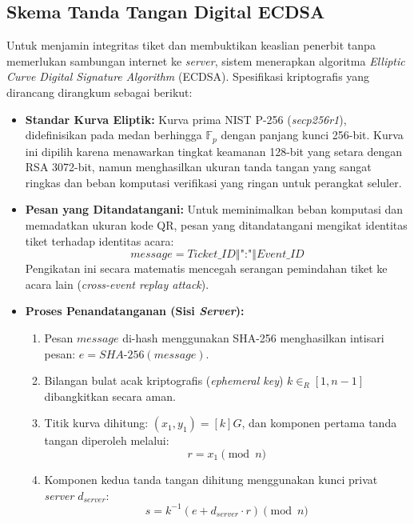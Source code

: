 \subsection{Skema Tanda Tangan Digital ECDSA}
Untuk menjamin integritas tiket dan membuktikan keaslian penerbit tanpa memerlukan sambungan internet ke \textit{server}, sistem menerapkan algoritma \textit{Elliptic Curve Digital Signature Algorithm} (ECDSA). Spesifikasi kriptografis yang dirancang dirangkum sebagai berikut:
\begin{itemize}
    \item \textbf{Standar Kurva Eliptik:} Kurva prima NIST P-256 (\textit{secp256r1}), didefinisikan pada medan berhingga $\mathbb{F}_p$ dengan panjang kunci 256-bit. Kurva ini dipilih karena menawarkan tingkat keamanan 128-bit yang setara dengan RSA 3072-bit, namun menghasilkan ukuran tanda tangan yang sangat ringkas dan beban komputasi verifikasi yang ringan untuk perangkat seluler.
    \item \textbf{Pesan yang Ditandatangani:} Untuk meminimalkan beban komputasi dan memadatkan ukuran kode QR, pesan yang ditandatangani mengikat identitas tiket terhadap identitas acara:
    \begin{equation}
        message = Ticket\_ID \mathbin{\Vert} \text{":"} \mathbin{\Vert} Event\_ID
    \end{equation}
    Pengikatan ini secara matematis mencegah serangan pemindahan tiket ke acara lain (\textit{cross-event replay attack}).
    \item \textbf{Proses Penandatanganan (Sisi \textit{Server}):}
    \begin{enumerate}
        \item Pesan $message$ di-hash menggunakan SHA-256 menghasilkan intisari pesan: $e = SHA\text{-}256(message)$.
        \item Bilangan bulat acak kriptografis (\textit{ephemeral key}) $k \in_R [1, n-1]$ dibangkitkan secara aman.
        \item Titik kurva dihitung: $(x_1, y_1) = [k]G$, dan komponen pertama tanda tangan diperoleh melalui:
        \begin{equation}
            r = x_1 \pmod n
        \end{equation}
        \item Komponen kedua tanda tangan dihitung menggunakan kunci privat \textit{server} $d_{server}$:
        \begin{equation}
            s = k^{-1} (e + d_{server} \cdot r) \pmod n
        \end{equation}

\end{enumerate}
\end{itemize}
